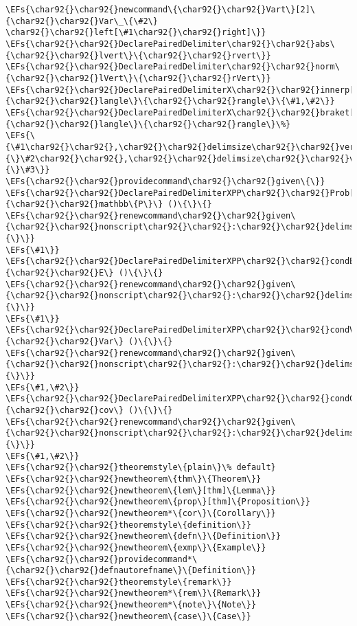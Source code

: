 \documentclass[c]{article}
\theoremstyle{plain}%
\theoremstyle{definition}
\theoremstyle{remark}
\newcommand{\EFs}[1]{\textcolor{EFs}{#1}} %
\begin{document}
\begin{Code}
\begin{Verbatim}
\EFs{\char92{}\char92{}newcommand\{\char92{}\char92{}Vart\}[2]\{\char92{}\char92{}Var\_\{\#2\} \char92{}\char92{}left[\#1\char92{}\char92{}right]\}}
\EFs{\char92{}\char92{}DeclarePairedDelimiter\char92{}\char92{}abs\{\char92{}\char92{}lvert\}\{\char92{}\char92{}rvert\}}
\EFs{\char92{}\char92{}DeclarePairedDelimiter\char92{}\char92{}norm\{\char92{}\char92{}lVert\}\{\char92{}\char92{}rVert\}}
\EFs{\char92{}\char92{}DeclarePairedDelimiterX\char92{}\char92{}innerp[2]\{\char92{}\char92{}langle\}\{\char92{}\char92{}rangle\}\{\#1,\#2\}}
\EFs{\char92{}\char92{}DeclarePairedDelimiterX\char92{}\char92{}braket[3]\{\char92{}\char92{}langle\}\{\char92{}\char92{}rangle\}\%}
\EFs{\{\#1\char92{}\char92{},\char92{}\char92{}delimsize\char92{}\char92{}vert\char92{}\char92{},\char92{}\char92{}mathopen\{\}\#2\char92{}\char92{},\char92{}\char92{}delimsize\char92{}\char92{}vert\char92{}\char92{},\char92{}\char92{}mathopen\{\}\#3\}}
\EFs{\char92{}\char92{}providecommand\char92{}\char92{}given\{\}}
\EFs{\char92{}\char92{}DeclarePairedDelimiterXPP\char92{}\char92{}Prob[1]\{\char92{}\char92{}mathbb\{P\}\} ()\{\}\{}
\EFs{\char92{}\char92{}renewcommand\char92{}\char92{}given\{\char92{}\char92{}nonscript\char92{}\char92{}:\char92{}\char92{}delimsize\char92{}\char92{}vert\char92{}\char92{}nonscript\char92{}\char92{}:\char92{}\char92{}mathopen\{\}\}}
\EFs{\#1\}}
\EFs{\char92{}\char92{}DeclarePairedDelimiterXPP\char92{}\char92{}condE[1]\{\char92{}\char92{}E\} ()\{\}\{}
\EFs{\char92{}\char92{}renewcommand\char92{}\char92{}given\{\char92{}\char92{}nonscript\char92{}\char92{}:\char92{}\char92{}delimsize\char92{}\char92{}vert\char92{}\char92{}nonscript\char92{}\char92{}:\char92{}\char92{}mathopen\{\}\}}
\EFs{\#1\}}
\EFs{\char92{}\char92{}DeclarePairedDelimiterXPP\char92{}\char92{}condVar[2]\{\char92{}\char92{}Var\} ()\{\}\{}
\EFs{\char92{}\char92{}renewcommand\char92{}\char92{}given\{\char92{}\char92{}nonscript\char92{}\char92{}:\char92{}\char92{}delimsize\char92{}\char92{}vert\char92{}\char92{}nonscript\char92{}\char92{}:\char92{}\char92{}mathopen\{\}\}}
\EFs{\#1,\#2\}}
\EFs{\char92{}\char92{}DeclarePairedDelimiterXPP\char92{}\char92{}condCov[2]\{\char92{}\char92{}cov\} ()\{\}\{}
\EFs{\char92{}\char92{}renewcommand\char92{}\char92{}given\{\char92{}\char92{}nonscript\char92{}\char92{}:\char92{}\char92{}delimsize\char92{}\char92{}vert\char92{}\char92{}nonscript\char92{}\char92{}:\char92{}\char92{}mathopen\{\}\}}
\EFs{\#1,\#2\}}
\EFs{\char92{}\char92{}theoremstyle\{plain\}\% default}
\EFs{\char92{}\char92{}newtheorem\{thm\}\{Theorem\}}
\EFs{\char92{}\char92{}newtheorem\{lem\}[thm]\{Lemma\}}
\EFs{\char92{}\char92{}newtheorem\{prop\}[thm]\{Proposition\}}
\EFs{\char92{}\char92{}newtheorem*\{cor\}\{Corollary\}}
\EFs{\char92{}\char92{}theoremstyle\{definition\}}
\EFs{\char92{}\char92{}newtheorem\{defn\}\{Definition\}}
\EFs{\char92{}\char92{}newtheorem\{exmp\}\{Example\}}
\EFs{\char92{}\char92{}providecommand*\{\char92{}\char92{}defnautorefname\}\{Definition\}}
\EFs{\char92{}\char92{}theoremstyle\{remark\}}
\EFs{\char92{}\char92{}newtheorem*\{rem\}\{Remark\}}
\EFs{\char92{}\char92{}newtheorem*\{note\}\{Note\}}
\EFs{\char92{}\char92{}newtheorem\{case\}\{Case\}}


\end{Verbatim}
\end{Code}
\end{document}
